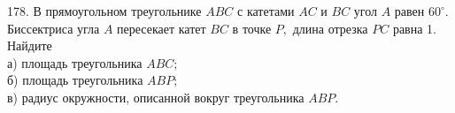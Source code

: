 178. В прямоугольном треугольнике $ABC$ с катетами $AC$ и $BC$ угол $A$ равен $60^\circ.$ Биссектриса угла $A$ пересекает катет $BC$ в точке $P,$ длина отрезка $PC$ равна 1. Найдите\\
а) площадь треугольника $ABC;$\\
б) площадь треугольника $ABP;$\\
в) радиус окружности, описанной вокруг треугольника $ABP.$\\
